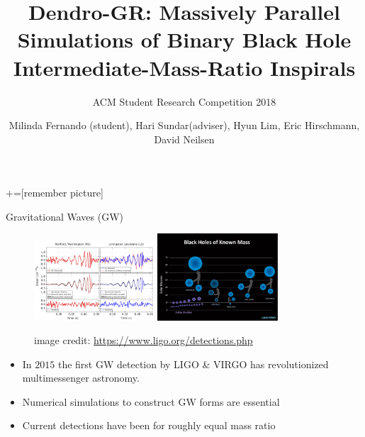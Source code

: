 \documentclass[16pt,xcolor=table]{beamer}
\title[DENDRO-GR]{Dendro-GR: Massively Parallel Simulations of Binary Black Hole Intermediate-Mass-Ratio Inspirals}
\subtitle{ACM Student Research Competition 2018}
\author[Fernando, Sundar, Lim, Hirschmann, Neilsen]{Milinda Fernando (student), Hari Sundar(adviser), Hyun Lim, Eric Hirschmann, David Neilsen}
\institute{\pgfuseimage{uoubig} \hspace{0.5cm} \pgfuseimage{byu} \hspace{0.5cm}\pgfuseimage{sc18} \hspace{0.5cm}\pgfuseimage{dendro}}
\begin{document}
+=[remember picture]


	\frame{\titlepage}
	

\begin{frame}{Gravitational Waves (GW)}
\begin{figure}
\includegraphics[width=0.4\textwidth]{figs/Fig1_Split_v17_top3_standalone.png} \hfill
\includegraphics[width=0.4\textwidth]{figs/BHmassChartGW170814-sm.jpg}
\caption{\small image credit: \url{https://www.ligo.org/detections.php}}
\end{figure}

\begin{itemize}
	\item In $2015$ the first GW detection by LIGO \& VIRGO has revolutionized multimessenger astronomy.
	\item Numerical simulations to construct GW forms are essential
	\item Current detections have been for roughly equal mass ratio
\end{itemize}

\end{frame}
\end{document}
